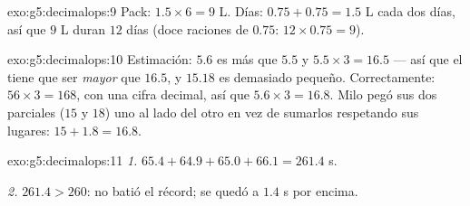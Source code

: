 \begin{solution}{exo:g5:decimalops:9}
Pack: $1.5 \times 6 = 9$ L. Días: $0.75 + 0.75 = 1.5$ L cada dos
días, así que $9$ L duran $12$ días (doce raciones de $0.75$:
$12 \times 0.75 = 9$).
\end{solution}

\begin{solution}{exo:g5:decimalops:10}
Estimación: $5.6$ es más que $5.5$ y $5.5 \times 3 = 16.5$ --- así que
el  tiene que ser \emph{mayor} que $16.5$, y $15.18$ es demasiado
pequeño. Correctamente: $56 \times 3 = 168$, con una cifra decimal, así que
$5.6 \times 3 = 16.8$. Milo pegó sus dos  parciales ($15$ y
$18$) uno al lado del otro en vez de sumarlos respetando sus lugares:
$15 + 1.8 = 16.8$.
\end{solution}

\begin{solution}{exo:g5:decimalops:11}
\emph{1.} $65.4 + 64.9 + 65.0 + 66.1 = 261.4$ s.

\emph{2.} $261.4 > 260$: no batió el récord; se quedó a
$1.4$ s por encima.
\end{solution}
